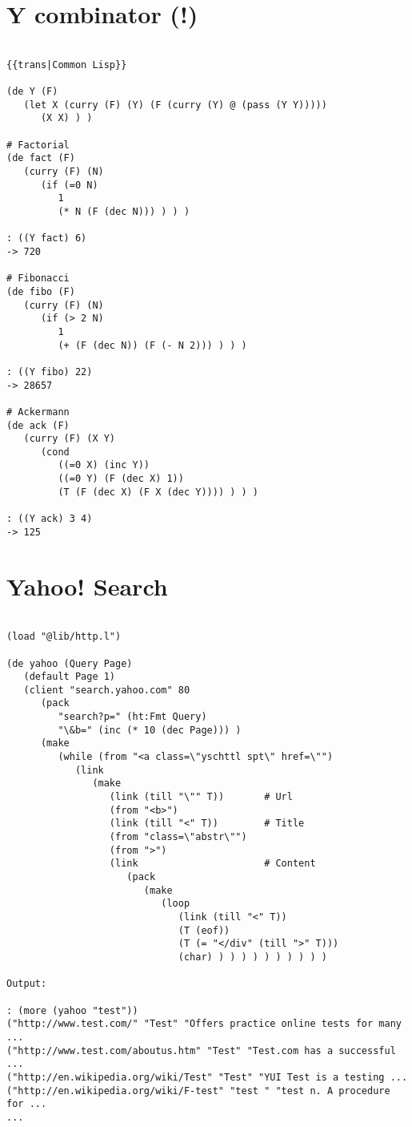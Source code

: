 \section*{Y combinator (!)}

\begin{verbatim}

{{trans|Common Lisp}}

(de Y (F)
   (let X (curry (F) (Y) (F (curry (Y) @ (pass (Y Y)))))
      (X X) ) )

# Factorial
(de fact (F)
   (curry (F) (N)
      (if (=0 N)
         1
         (* N (F (dec N))) ) ) )

: ((Y fact) 6)
-> 720

# Fibonacci
(de fibo (F)
   (curry (F) (N)
      (if (> 2 N)
         1
         (+ (F (dec N)) (F (- N 2))) ) ) )

: ((Y fibo) 22)
-> 28657

# Ackermann
(de ack (F)
   (curry (F) (X Y)
      (cond
         ((=0 X) (inc Y))
         ((=0 Y) (F (dec X) 1))
         (T (F (dec X) (F X (dec Y)))) ) ) )

: ((Y ack) 3 4)
-> 125

\end{verbatim}

\section*{Yahoo! Search}

\begin{verbatim}

(load "@lib/http.l")

(de yahoo (Query Page)
   (default Page 1)
   (client "search.yahoo.com" 80
      (pack
         "search?p=" (ht:Fmt Query)
         "\&b=" (inc (* 10 (dec Page))) )
      (make
         (while (from "<a class=\"yschttl spt\" href=\"")
            (link
               (make
                  (link (till "\"" T))       # Url
                  (from "<b>")
                  (link (till "<" T))        # Title
                  (from "class=\"abstr\"")
                  (from ">")
                  (link                      # Content
                     (pack
                        (make
                           (loop
                              (link (till "<" T))
                              (T (eof))
                              (T (= "</div" (till ">" T)))
                              (char) ) ) ) ) ) ) ) ) ) )

Output:

: (more (yahoo "test"))
("http://www.test.com/" "Test" "Offers practice online tests for many ...
("http://www.test.com/aboutus.htm" "Test" "Test.com has a successful ...
("http://en.wikipedia.org/wiki/Test" "Test" "YUI Test is a testing ...
("http://en.wikipedia.org/wiki/F-test" "test " "test n. A procedure for ...
...

\end{verbatim}

